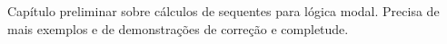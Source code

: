 \documentclass[../../../include/open-logic-chapter]{subfiles}
\begin{document}
\begin{editorial}
  Capítulo preliminar sobre cálculos de sequentes para lógica modal.
  Precisa de mais exemplos e de demonstrações de correção e completude.
\end{editorial}


\OLEndChapterHook
\end{document}
